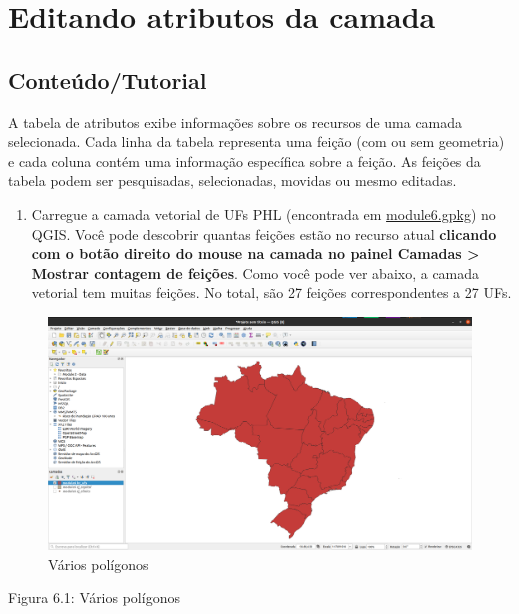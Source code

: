 \documentclass[
  portuguese,
]{krantz}
\providecommand{\tightlist}{%
  \setlength{\itemsep}{0pt}\setlength{\parskip}{0pt}}
\begin{document}
\hypertarget{editando-atributos-da-camada}{%
\section{Editando atributos da camada}\label{editando-atributos-da-camada}}

\hypertarget{conteuxfadotutorial-2}{%
\subsection{\texorpdfstring{\textbf{Conteúdo/Tutorial}}{Conteúdo/Tutorial}}\label{conteuxfadotutorial-2}}

A tabela de atributos exibe informações sobre os recursos de uma camada selecionada. Cada linha da tabela representa uma feição (com ou sem geometria) e cada coluna contém uma informação específica sobre a feição. As feições da tabela podem ser pesquisadas, selecionadas, movidas ou mesmo editadas.

\begin{enumerate}
\def\labelenumi{\arabic{enumi}.}
\tightlist
\item
  Carregue a camada vetorial de UFs PHL (encontrada em \href{data/module6.gpkg}{module6.gpkg}) no QGIS. Você pode descobrir quantas feições estão no recurso atual \textbf{clicando com o botão direito do mouse na camada no painel Camadas \textgreater{} Mostrar contagem de feições}. Como você pode ver abaixo, a camada vetorial tem muitas feições. No total, são 27 feições correspondentes a 27 UFs.
\end{enumerate}

\begin{figure}
\centering
\includegraphics{media/modulo6/many-polygons.png}
\caption{Vários polígonos}
\end{figure}

Figura 6.1: Vários polígonos
\end{document}

